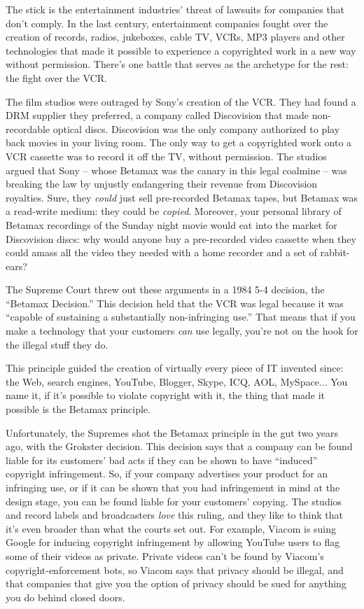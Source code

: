 The stick is the entertainment industries' threat of lawsuits for
companies that don't comply. In the last century, entertainment
companies fought over the creation of records, radios, jukeboxes,
cable TV, VCRs, MP3 players and other technologies that made it
possible to experience a copyrighted work in a new way without
permission. There's one battle that serves as the archetype for the
rest: the fight over the VCR.

The film studios were outraged by Sony's creation of the VCR. They
had found a DRM supplier they preferred, a company called
Discovision that made non-recordable optical discs. Discovision was
the only company authorized to play back movies in your living
room. The only way to get a copyrighted work onto a VCR cassette
was to record it off the TV, without permission. The studios argued
that Sony -- whose Betamax was the canary in this legal coalmine --
was breaking the law by unjustly endangering their revenue from
Discovision royalties. Sure, they \emph{could} just sell
pre-recorded Betamax tapes, but Betamax was a read-write medium:
they could be \emph{copied}. Moreover, your personal library of
Betamax recordings of the Sunday night movie would eat into the
market for Discovision discs: why would anyone buy a pre-recorded
video cassette when they could amass all the video they needed with
a home recorder and a set of rabbit-ears?

The Supreme Court threw out these arguments in a 1984 5-4 decision,
the ``Betamax Decision.'' This decision held that the VCR was legal
because it was ``capable of sustaining a substantially
non-infringing use.'' That means that if you make a technology that
your customers \emph{can} use legally, you're not on the hook for
the illegal stuff they do.

This principle guided the creation of virtually every piece of IT
invented since: the Web, search engines, YouTube, Blogger, Skype,
ICQ, AOL, MySpace... You name it, if it's possible to violate
copyright with it, the thing that made it possible is the Betamax
principle.

Unfortunately, the Supremes shot the Betamax principle in the gut
two years ago, with the Grokster decision. This decision says that
a company can be found liable for its customers' bad acts if they
can be shown to have ``induced'' copyright infringement. So, if your
company advertises your product for an infringing use, or if it can
be shown that you had infringement in mind at the design stage, you
can be found liable for your customers' copying. The studios and
record labels and broadcasters \emph{love} this ruling, and they
like to think that it's even broader than what the courts set out.
For example, Viacom is suing Google for inducing copyright
infringement by allowing YouTube users to flag some of their videos
as private. Private videos can't be found by Viacom's
copyright-enforcement bots, so Viacom says that privacy should be
illegal, and that companies that give you the option of privacy
should be sued for anything you do behind closed doors.

